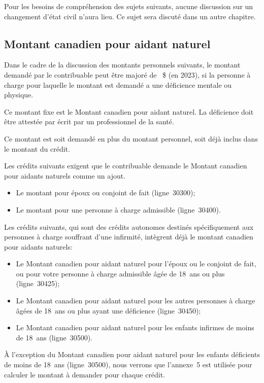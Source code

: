 \begin{note}
	Pour les besoins de compréhension des sujets suivants, aucune discussion sur un changement d'état civil n'aura lieu. Ce sujet sera discuté dans un autre chapitre.
\end{note}


\subsection{Montant canadien pour aidant naturel}
Dans le cadre de la discussion des montants personnels suivants, le montant demandé par le contribuable peut être majoré de ~\$ (en 2023), si la personne à charge pour laquelle le montant est demandé a une déficience mentale ou physique. 

Ce montant fixe est le Montant canadien pour aidant naturel. La déficience doit être attestée par écrit par un professionnel de la santé. 

Ce montant est soit demandé en plus du montant personnel, soit déjà inclus dans le montant du crédit. 

Les crédits suivants exigent que le contribuable demande le Montant canadien pour aidants naturels comme un ajout.
\begin{itemize}
	\item Le montant pour époux ou conjoint de fait (ligne~30300);
	\item Le montant pour une personne à charge admissible (ligne~30400).
\end{itemize}

Les crédits suivants, qui sont des crédits autonomes destinés spécifiquement aux personnes à charge souffrant d'une infirmité, intègrent déjà le montant canadien pour aidants naturels:
\begin{itemize}
	\item Le Montant canadien pour aidant naturel pour l'époux ou le conjoint de fait, ou pour votre personne à charge admissible âgée de 18~ans ou plus (ligne~30425);
	\item Le Montant canadien pour aidant naturel pour les autres personnes à charge âgées de 18~ans ou plus ayant une déficience (ligne~30450);
	\item Le Montant canadien pour aidant naturel pour les enfants infirmes de moins de 18~ans (ligne~30500).
\end{itemize}

À l'exception du Montant canadien pour aidant naturel pour les enfants déficients de moins de 18~ans (ligne~30500), nous verrons que l'annexe~5 est utilisée pour calculer le montant à demander pour chaque crédit.

